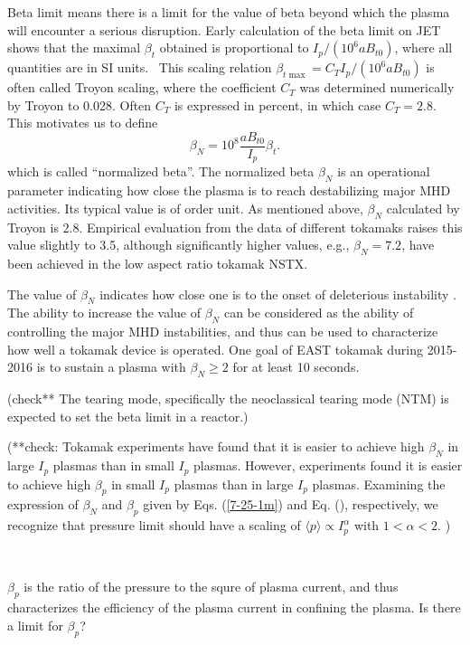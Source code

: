 \documentclass{llncs}
\begin{document}
Beta limit means there is a limit for the value of beta beyond which the
plasma will encounter a serious disruption. Early calculation of the beta
limit on JET shows that the maximal $\beta_t$ obtained is proportional to $I_p
/ (10^6 a B_{t 0})$, where all quantities are in SI units. \ This scaling
relation $\beta_{t \max} = C_T I_p / (10^6 a B_{t 0})$ is often called Troyon
scaling, where the coefficient $C_T$ was determined numerically by Troyon to
0.028. Often $C_T$ is expressed in percent, in which case $C_T = 2.8$. This
motivates us to define
\begin{equation}
  \label{1-13-e1} \beta_N = 10^8 \frac{a B_{t 0}}{I_p} \beta_t .
\end{equation}
which is called ``normalized beta''. The normalized beta $\beta_N$ is an
operational parameter indicating how close the plasma is to reach
destabilizing major MHD activities. Its typical value is of order unit. As
mentioned above, $\beta_N$ calculated by Troyon is $2.8$. Empirical evaluation
from the data of different tokamaks raises this value slightly to 3.5,
although significantly higher values, e.g., $\beta_N = 7.2$, have been
achieved in the low aspect ratio tokamak NSTX{\cite{sabbagh2006}}.

The value of $\beta_N$ indicates how close one is to the onset of deleterious
instability . The ability to increase the value of $\beta_N$ can be considered
as the ability of controlling the major MHD instabilities, and thus can be
used to characterize how well a tokamak device is operated. One goal of EAST
tokamak during 2015-2016 is to sustain a plasma with $\beta_N \geqslant 2$ for
at least 10 seconds.

(check** The tearing mode, specifically the neoclassical tearing mode (NTM)
is expected to set the beta limit in a reactor.)

(**check: Tokamak experiments have found that it is easier to achieve high
$\beta_N$ in large $I_p$ plasmas than in small $I_p$ plasmas. However,
experiments found it is easier to achieve high $\beta_p$ in small $I_p$
plasmas than in large $I_p$ plasmas. Examining the expression of $\beta_N$ and
$\beta_p$ given by Eqs. (\ref{7-25-1m}) and Eq. (), respectively, we recognize
that pressure limit should have a scaling of $\langle p \rangle \propto
I_p^{\alpha}$ with $1 < \alpha < 2$. )

\

$\beta_p$ is the ratio of the pressure to the squre of plasma current, and
thus characterizes the efficiency of the plasma current in confining the
plasma. Is there a limit for $\beta_p$?
\end{document}
